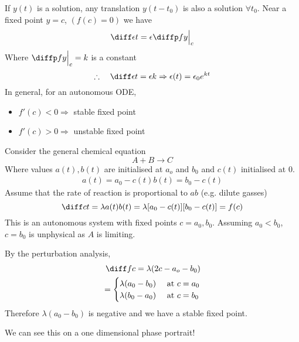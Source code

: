 \documentclass{article}
\begin{document}
If $y(t)$ is a solution, any translation $y(t - t_0)$ is also a solution $\forall t_0$.
Near a fixed point $y = c$, $(f(c) = 0)$ we have
\[
    \diff \epsilon t = \epsilon \diffp fy \eval{c}{}
\]
Where $\diffp fy \eval{c}{} = k$ is a constant
\[
    \therefore \quad \diff \epsilon t = \epsilon k \Rightarrow \epsilon(t) = \epsilon_0 e^{kt}
\]
In general, for an autonomous ODE, 
\begin{itemize}
    \item $f'(c) < 0 \Rightarrow$ stable fixed point
    \item $f'(c) > 0 \Rightarrow$ unstable fixed point
\end{itemize}

\begin{eg}
    Consider the general chemical equation
    \[
        A + B \longrightarrow C
    \]
    Where values $a(t), b(t)$ are initialised at $a_o$ and $b_0$ and $c(t)$ initialised at $0$.
    \begin{align*}
        a(t) = a_0 - c(t)
        b(t) = b_0 - c(t)
    \end{align*}
    Assume that the rate of reaction is proportional to $ab$ (e.g. dilute gasses)
    \[
        \diff ct = \lambda a(t)b(t) = \lambda [a_0 - c(t)][b_0 - c(t)] = f(c)
    \]
    This is an autonomous system with fixed points $c = a_0, b_0$.
    Assuming $a_0 < b_0$, $c = b_0$ is unphysical as $A$ is limiting.

    By the perturbation analysis,
    \begin{align*}
        \diff fc = \lambda(2c - a_o - b_0) \\
        = \begin{cases}
            \lambda(a_0 - b_0) & \text{ at } c = a_0 \\
            \lambda(b_0 - a_0) & \text{ at } c = b_0
        \end{cases}
    \end{align*}
    Therefore $\lambda(a_0 - b_0)$ is negative and we have a stable fixed point.

    We can see this on a one dimensional phase portrait!
\end{eg}

\end{document}
